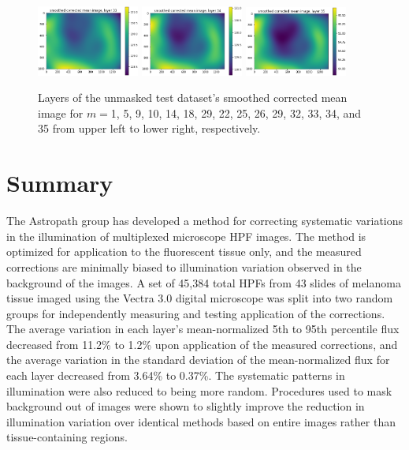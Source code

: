 \documentclass[letterpaper,11pt]{article}
\begin{document}
\begin{figure}[!ht]
\includegraphics[width=0.3\textwidth]{images/results/unmasked_smoothed_corrected_mean_image_layers/unmasked_smoothed_corrected_mean_image_layer_33}
\includegraphics[width=0.3\textwidth]{images/results/unmasked_smoothed_corrected_mean_image_layers/unmasked_smoothed_corrected_mean_image_layer_34}
\includegraphics[width=0.3\textwidth]{images/results/unmasked_smoothed_corrected_mean_image_layers/unmasked_smoothed_corrected_mean_image_layer_35}
\caption{\footnotesize Layers of the unmasked test dataset's smoothed corrected mean image for $m=$1, 5, 9, 10, 14, 18, 29, 22, 25, 26, 29, 32, 33, 34, and 35 from upper left to lower right, respectively.}
\label{fig:unmasked_smoothed_corrected_mean_image_layers}
\end{figure}

\section{Summary}
\label{sec:summary}

The Astropath group has developed a method for correcting systematic variations in the illumination of multiplexed microscope HPF images. The method is optimized for application to the fluorescent tissue only, and the measured corrections are minimally biased to illumination variation observed in the background of the images. A set of 45,384 total HPFs from 43 slides of melanoma tissue imaged using the Vectra 3.0 digital microscope was split into two random groups for independently measuring and testing application of the corrections. The average variation in each layer's mean-normalized 5th to 95th percentile flux decreased from 11.2\% to 1.2\% upon application of the measured corrections, and the average variation in the standard deviation of the mean-normalized flux for each layer decreased from 3.64\% to 0.37\%. The systematic patterns in illumination were also reduced to being more random. Procedures used to mask background out of images were shown to slightly improve the reduction in illumination variation over identical methods based on entire images rather than tissue-containing regions.

\clearpage

\end{document}
